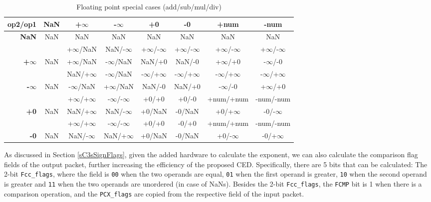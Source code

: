 \documentclass[12pt]{yalephd}
\begin{document}
\begin{table}[!ht]
\caption{Floating point special cases (add/sub/mul/div)}\label{sC3tFloatSpecial}
\footnotesize
\begin{center}
\begin{threeparttable}[b]
\begin{tabular}{||r|c|c|c|c|c|c|c||}
\hline
\hline
{\bf op2/op1} & {\bf NaN} & {\bf +$\infty$} & {\bf -$\infty$} & {\bf +0} & {\bf -0} & {\bf +num} & {\bf -num} \\
\hline
{\bf NaN} & NaN & NaN & NaN & NaN & NaN & NaN & NaN  \\
\hline
 & & +$\infty$/NaN & NaN/-$\infty$ & +$\infty$/-$\infty$ & +$\infty$/-$\infty$ & +$\infty$/-$\infty$ & +$\infty$/-$\infty$   \\
{\bf +$\infty$} &NaN&+$\infty$/NaN&-$\infty$/NaN&NaN/+0&NaN/-0&+$\infty$/+0&-$\infty$/-0\\
\hline
& & NaN/+$\infty$ & -$\infty$/NaN & -$\infty$/+$\infty$ & -$\infty$/+$\infty$ & -$\infty$/+$\infty$ & -$\infty$/+$\infty$ \\
{\bf -$\infty$} & NaN & -$\infty$/NaN & +$\infty$/NaN& NaN/-0& NaN/+0& -$\infty$/-0& +$\infty$/+0\\
\hline
& & +$\infty$/+$\infty$& -$\infty$/-$\infty$& +0/+0& +0/-0& +num/+num& -num/-num\\
{\bf +0} & NaN & NaN/+$\infty$& NaN/-$\infty$& +0/NaN& -0/NaN& +0/+$\infty$& -0/-$\infty$\\
\hline
& & +$\infty$/+$\infty$& -$\infty$/-$\infty$& +0/+0& -0/+0& +num/+num& -num/-num\\
{\bf -0} & NaN & NaN/-$\infty$& NaN/+$\infty$& +0/NaN& -0/NaN& +0/-$\infty$& -0/+$\infty$\\
\hline
\hline
\end{tabular}
\end{threeparttable}
\end{center}
\end{table}

As discussed in Section \ref{sC3sSignFlags}, given the added hardware to calculate the exponent, we can also calculate the comparison flag fields of the output packet, further increasing the efficiency of the proposed CED. Specifically, there are 5 bits that can be calculated: The 2-bit {\tt Fcc\_flags}, where the field is {\tt 00} when the two operands are equal, {\tt 01} when the first operand is greater, {\tt 10} when the second operand is greater and {\tt 11} when the two operands are unordered (in case of NaNs). Besides the 2-bit {\tt Fcc\_flags}, the {\tt FCMP} bit is 1 when there is a comparison operation, and the {\tt PCX\_flags} are copied from the respective field of the input packet.
\end{document}
